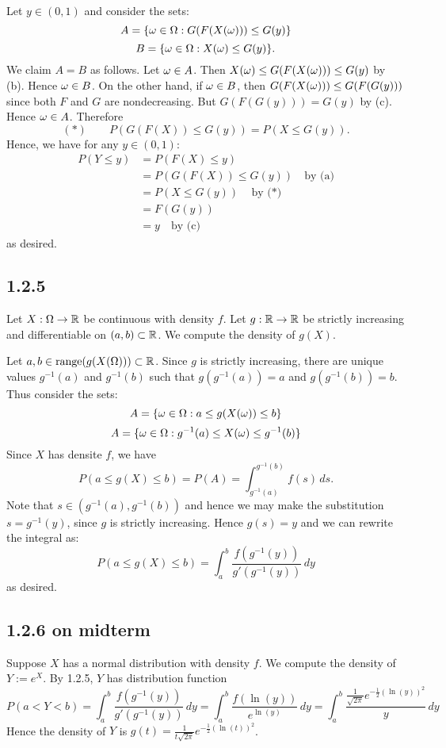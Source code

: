 \documentclass[11pt]{article}
\begin{document}
    Let $y \in (0,1)$ and consider the sets: \[A = \{\omega \in \Omega : G(F(X(\omega))) \leq G(y)\}\]\[B = \{\omega \in \Omega : X(\omega) \leq G(y)\}.\] We claim $A = B$ as follows. Let $\omega \in A$. Then $X(\omega) \leq G(F(X(\omega))) \leq G(y)$ by (b). Hence $\omega \in B$. On the other hand, if $\omega \in B$, then $G(F(X(\omega))) \leq G(F(G(y)))$ since both $F$ and $G$ are nondecreasing. But $G(F(G(y))) = G(y)$ by (c). Hence $\omega \in A$. Therefore \[(*) \quad\quad P(G(F(X)) \leq G(y)) = P(X \leq G(y)). \] Hence, we have for any $y \in (0,1)$:\begin{align*}
    P(Y \leq y) &= P(F(X) \leq y)\\
    &= P(G(F(X)) \leq G(y)) \quad \text{by (a)} \\
    &= P(X \leq G(y))\quad \text{by ($*$)}\\
    &= F(G(y)) \\
    &= y \quad \text{by (c)}
\end{align*} as desired.

\subsection*{1.2.5}

Let $X:\Omega \to {\mathbb R}$ be continuous with density $f$. Let $g:{\mathbb R} \to {\mathbb R}$ be strictly increasing and differentiable on $(a,b) \subset {\mathbb R}$. We compute the density of $g(X)$.

Let $a, b \in \text{range}(g(X(\Omega))) \subset {\mathbb R}$. Since $g$ is strictly increasing, there are unique values $g^{-1}(a)$ and $g^{-1}(b)$ such that $g(g^{-1}(a)) = a$ and $g(g^{-1}(b))=b$. Thus consider the sets: \[A = \{\omega \in \Omega : a \leq g(X(\omega))\leq  b\}\]\[A = \{\omega \in \Omega : g^{-1}(a) \leq X(\omega)\leq  g^{-1}(b)\}\] Since $X$ has densite $f$, we have \[P(a\leq g(X) \leq b)=P(A) = \int_{g^{-1}(a)}^{g^{-1}(b)} f(s)  \,ds.\] Note that $s \in ({g^{-1}(a)},{g^{-1}(b)})$ and hence we may make the substitution $s = g^{-1}(y)$, since $g$ is strictly increasing. Hence $g(s) = y$ and we can rewrite the integral as: \[P(a\leq g(X) \leq b) =\int_{a}^{b} \frac{f(g^{-1}(y))}{g'(g^{-1}(y))}  \,dy\] as desired.

\subsection*{1.2.6 on midterm}

Suppose $X$ has a normal distribution with density $f$. We compute the density of $Y := e^X$. By 1.2.5, $Y$ has distribution function \[P(a<Y<b)=\int_a^b \frac{f(g^{-1}(y))}{g'(g^{-1}(y))} \,dy = \int_a^b \frac{f(\ln(y))}{e^{\ln(y)}} \, dy = \int_a^b \frac{\frac{1}{\sqrt{2\pi}} e^{-\frac12 (\ln(y))^2}}{y} \, dy\] Hence the density of $Y$ is $g(t) = \frac{1}{t\sqrt{2\pi}} e^{-\frac12 (\ln(t))^2}$.
\end{document}
